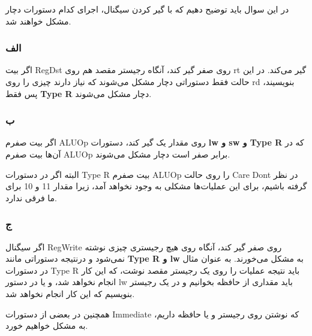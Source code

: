 در این سوال باید توضیح دهیم که با گیر کردن سیگنال، اجرای کدام دستورات دچار مشکل خواهند شد.


\subsubsection*{الف}
اگر بیت RegDst روی صفر گیر کند، آنگاه رجیستر مقصد هم روی rt گیر می‌کند. در این حالت فقط دستوراتی دچار مشکل می‌شوند که نیاز دارند چیزی را روی rd بنویسیند، پس فقط \textbf{Type R} دچار مشکل می‌شوند.
\subsubsection*{ب}
اگر بیت صفرم ALUOp روی مقدار یک گیر کند، دستورات \textbf{lw و sw و Type R} که در آن‌ها بیت صفرم ALUOp برابر صفر است دچار مشکل می‌شوند.

البته اگر در دستورات Type R بیت صفرم ALUOp را روی حالت Care Dont در نظر گرفته باشیم، برای این عملیات‌ها مشکلی به وجود نخواهد آمد، زیرا مقدار 11 و 10 برای ما فرقی ندارد.
\subsubsection*{ج}
اگر سیگنال RegWrite روی صفر گیر کند، آنگاه روی هیچ رجیستری چیزی نوشته نمی‌شود و درنتیجه دستوراتی مانند \textbf{Type R و lw} به مشکل می‌خورند. به عنوان مثال در دستورات Type R باید نتیجه عملیات را روی یک رجیستر مقصد نوشت، که این کار انجام نخواهد شد، و یا در دستور lw باید مقداری از حافظه بخوانیم و در یک رجیستر بنویسیم که این کار انجام نخواهد شد.

همچنین در بعضی از دستورات Immediate که نوشتن روی رجیستر و یا حافظه داریم، به مشکل خواهیم خورد.